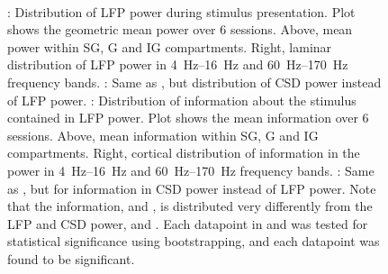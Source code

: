\begin{figure}[htbp]%
    \centering
    \hspace*{\fill}
    \hspace*{\fill}\hspace{.2cm}\hspace*{\fill}
    \hspace*{\fill}
    \\
    \hspace*{\fill}
    \hspace*{\fill}\hspace{.2cm}\hspace*{\fill}
    \hspace*{\fill}
    \caption{
\protect{}: Distribution of \ac{LFP} power during stimulus presentation.
Plot shows the geometric mean power over \num{6} sessions.
Above, mean power within \ac{SG}, \ac{G} and \ac{IG} compartments.
Right, laminar distribution of \ac{LFP} power in \SIrange{4}{16}{Hz} and \SIrange{60}{170}{Hz} frequency bands.
\protect{}: Same as \protect{}, but distribution of \ac{CSD} power instead of \ac{LFP} power.
\protect{}: Distribution of information about the stimulus contained in \ac{LFP} power.
Plot shows the mean information over \num{6} sessions.
Above, mean information within \ac{SG}, \ac{G} and \ac{IG} compartments.
Right, cortical distribution of information in the power in \SIrange{4}{16}{Hz} and \SIrange{60}{170}{Hz} frequency bands.
\protect{}: Same as \protect{}, but for information in \ac{CSD} power instead of \ac{LFP} power.
Note that the information, \protect{} and \protect{}, is distributed very differently from the \ac{LFP} and \ac{CSD} power, \protect{} and \protect{}.
Each datapoint in \protect{} and \protect{} was tested for statistical significance using bootstrapping, and each datapoint was found to be significant.
    \label{fig:lam_info}
}
\end{figure}

